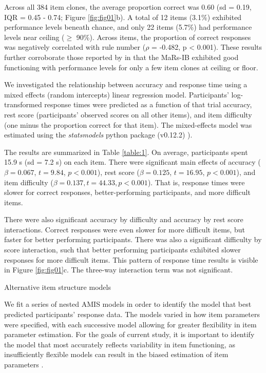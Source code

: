 \documentclass[a4paper,man,natbib]{apa6}
\makeatletter
\renewcommand{\subsubsection}{\@startsection{subsubsection}{3}
  {\z@}%
  {\b@level@two@skip}{\e@level@two@skip}%
  {\normalfont\normalsize\bfseries}}
\makeatother
\begin{document}
Across all 384 item clones, the average proportion correct was 0.60 (sd = 0.19, IQR = 0.45 - 0.74; Figure \ref{fig:fig01}b). A total of 12 items (3.1\%) exhibited performance levels beneath chance, and only 22 items (5.7\%) had performance levels near ceiling ($\geq$ 90\%). Across items, the proportion of correct responses was negatively correlated with rule number ($\rho$ = -0.482, p < 0.001). These results further corroborate those reported by \cite{chierchia2019matrix} in that the MaRs-IB exhibited good functioning with performance levels for only a few item clones at ceiling or floor. 

We investigated the relationship between accuracy and response time using a mixed effects (random intercepts) linear regression model. Participants' log-transformed response times were predicted as a function of that trial accuracy, rest score (participants' observed scores on all other items), and item difficulty (one minus the proportion correct for that item). The mixed-effects model was estimated using the \textit{statsmodels} python package (v0.12.2) \citep{seabold2010statsmodels}).

The results are summarized in Table \ref{table:1}. On average, participants spent 15.9 s (sd = 7.2 s) on each item. There were significant main effects of accuracy ($\beta = 0.067$, $t = 9.84$, $p < 0.001$), rest score ($\beta = 0.125$, $t = 16.95$, $p < 0.001$), and item difficulty ($\beta = 0.137, t = 44.33, p < 0.001$). That is, response times were slower for correct responses, better-performing participants, and more difficult items.

There were also significant accuracy by difficulty and  accuracy by rest score interactions. Correct responses were even slower for more difficult items, but faster for better performing participants. There was also a significant difficulty by score interaction, such that better performing participants exhibited slower responses for more difficult items. This pattern of response time results is visible in Figure \ref{fig:fig01}c. The three-way interaction term was not significant. 

\subsubsection{Alternative item structure models}

We fit a series of nested AMIS models in order to identify the model that best predicted participants' response data. The models varied in how item parameters were specified, with each successive model allowing for greater flexibility in item parameter estimation. For the goals of current study, it is important to identify the model that most accurately reflects variability in item functioning, as insufficiently flexible models can result in the biased estimation of item parameters \citep{lathrop2017item}. 
\end{document}
